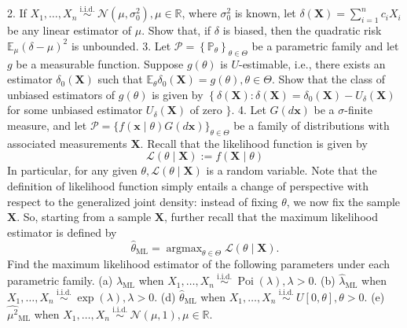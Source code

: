 2. If \(X_{1}, \ldots, X_{n} \stackrel{\text { i.i.d. }}{\sim} \mathcal{N}\left(\mu, \sigma_{0}^{2}\right), \mu \in \mathbb{R}\), where \(\sigma_{0}^{2}\) is known, let \(\delta(\mathbf{X})=\sum_{i=1}^{n} c_{i} X_{i}\) be any linear estimator of \(\mu\). Show that, if \(\delta\) is biased, then the quadratic risk \(\mathbb{E}_{\mu}(\delta-\mu)^{2}\) is unbounded.
3. Let \(\mathcal{P}=\left\{\mathbb{P}_{\theta}\right\}_{\theta \in \Theta}\) be a parametric family and let \(g\) be a measurable function. Suppose \(g(\theta)\) is \(U\)-estimable, i.e., there exists an estimator \(\delta_{0}(\mathbf{X})\) such that \(\mathbb{E}_{\theta} \delta_{0}(\mathbf{X})=g(\theta), \theta \in \Theta\). Show that the class of unbiased estimators of \(g(\theta)\) is given by
\(\left\{\delta(\mathbf{X}): \delta(\mathbf{X})=\delta_{0}(\mathbf{X})-U_{\delta}(\mathbf{X})\right.\) for some unbiased estimator \(U_{\delta}(\mathbf{X})\) of zero \(\}\).
4. Let \(G(d \mathbf{x})\) be a \(\sigma\)-finite measure, and let \(\mathcal{P}=\{f(\mathbf{x} \mid \theta) G(d \mathbf{x})\}_{\theta \in \Theta}\) be a family of distributions with associated measurements \(\mathbf{X}\). Recall that the likelihood function is given by
\[
\mathcal{L}(\theta \mid \mathbf{X}):=f(\mathbf{X} \mid \theta)
\]
In particular, for any given \(\theta, \mathcal{L}(\theta \mid \mathbf{X})\) is a random variable. Note that the definition of likelihood function simply entails a change of perspective with respect to the generalized joint density: instead of fixing \(\theta\), we now fix the sample \(\mathbf{X}\). So, starting from a sample \(\mathbf{X}\), further recall that the maximum likelihood estimator is defined by
\[
\widehat{\theta}_{\mathrm{ML}}=\operatorname{argmax}_{\theta \in \Theta} \mathcal{L}(\theta \mid \mathbf{X}) .
\]
Find the maximum likelihood estimator of the following parameters under each parametric family.
(a) \(\widehat{\lambda}_{\mathrm{ML}}\) when \(X_{1}, \ldots, X_{n} \stackrel{\text { i.i.d. }}{\sim} \operatorname{Poi}(\lambda), \lambda>0\).
(b) \(\widehat{\lambda}_{\mathrm{ML}}\) when \(X_{1}, \ldots, X_{n} \stackrel{\text { i.i.d. }}{\sim} \exp (\lambda), \lambda>0\).
(d) \(\widehat{\theta}_{\mathrm{ML}}\) when \(X_{1}, \ldots, X_{n} \stackrel{\text { i.i.d. }}{\sim} U[0, \theta], \theta>0\).
(e) \(\widehat{\mu^{2}}{ }_{\mathrm{ML}}\) when \(X_{1}, \ldots, X_{n} \stackrel{\text { i.i.d. }}{\sim} \mathcal{N}(\mu, 1), \mu \in \mathbb{R}\).